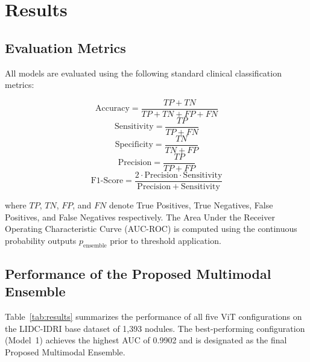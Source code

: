 \documentclass[AMA,STIX1COL]{WileyNJD-v2}
\begin{document}
\section{Results}\label{sec3}

\subsection{Evaluation Metrics}

All models are evaluated using the following standard clinical classification metrics:

\begin{equation}
\mathrm{Accuracy} = \frac{TP+TN}{TP+TN+FP+FN}
\end{equation}
\begin{equation}
\mathrm{Sensitivity} = \frac{TP}{TP+FN}
\end{equation}
\begin{equation}
\mathrm{Specificity} = \frac{TN}{TN+FP}
\end{equation}
\begin{equation}
\mathrm{Precision} = \frac{TP}{TP+FP}
\end{equation}
\begin{equation}
\mathrm{F1\text{-}Score} = \frac{2\cdot\mathrm{Precision}\cdot\mathrm{Sensitivity}}{\mathrm{Precision}+\mathrm{Sensitivity}}
\end{equation}

where $TP$, $TN$, $FP$, and $FN$ denote True Positives, True Negatives, False Positives, and False Negatives respectively. The Area Under the Receiver Operating Characteristic Curve (AUC-ROC) is computed using the continuous probability outputs $p_{\mathrm{ensemble}}$ prior to threshold application.

\subsection{Performance of the Proposed Multimodal Ensemble}

Table~\ref{tab:results} summarizes the performance of all five ViT configurations on the LIDC-IDRI base dataset of 1,393 nodules. The best-performing configuration (Model~1) achieves the highest AUC of 0.9902 and is designated as the final Proposed Multimodal Ensemble.
\end{document}
